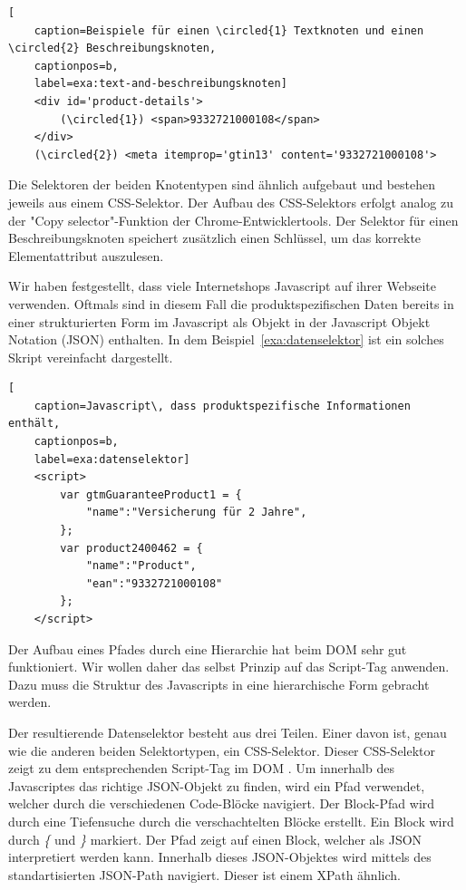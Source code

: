 \begin{lstlisting}[
    caption=Beispiele für einen \circled{1} Textknoten und einen \circled{2} Beschreibungsknoten,
    captionpos=b,
    label=exa:text-and-beschreibungsknoten]
    <div id='product-details'>
        (\circled{1}) <span>9332721000108</span>
    </div>
    (\circled{2}) <meta itemprop='gtin13' content='9332721000108'>
\end{lstlisting}

Die Selektoren der beiden Knotentypen sind ähnlich aufgebaut und bestehen jeweils aus einem CSS-Selektor.
Der Aufbau des CSS-Selektors erfolgt analog zu der "Copy selector"-Funktion der Chrome-Entwicklertools.
Der Selektor für einen Beschreibungsknoten speichert zusätzlich einen Schlüssel, um das korrekte Elementattribut
auszulesen.

Wir haben festgestellt, dass viele Internetshops Javascript auf ihrer Webseite verwenden.
Oftmals sind in diesem Fall die produktspezifischen Daten bereits in einer strukturierten Form im Javascript
als Objekt in der Javascript Objekt Notation (JSON) enthalten.
In dem Beispiel~\ref{exa:datenselektor} ist ein solches Skript vereinfacht dargestellt.

\begin{lstlisting}[
    caption=Javascript\, dass produktspezifische Informationen enthält,
    captionpos=b,
    label=exa:datenselektor]
    <script>
        var gtmGuaranteeProduct1 = {
            "name":"Versicherung für 2 Jahre",
        };
        var product2400462 = {
            "name":"Product",
            "ean":"9332721000108"
        };
    </script>
\end{lstlisting}

Der Aufbau eines Pfades durch eine Hierarchie hat beim DOM sehr gut funktioniert.
Wir wollen daher das selbst Prinzip auf das Script-Tag anwenden.
Dazu muss die Struktur des Javascripts in eine hierarchische Form gebracht werden.

Der resultierende Datenselektor besteht aus drei Teilen.
Einer davon ist, genau wie die anderen beiden Selektortypen, ein CSS-Selektor.
Dieser CSS-Selektor zeigt zu dem entsprechenden Script-Tag im DOM .
Um innerhalb des Javascriptes das richtige JSON-Objekt zu finden, wird ein Pfad verwendet, welcher durch die
verschiedenen Code-Blöcke navigiert.
Der Block-Pfad wird durch eine Tiefensuche durch die verschachtelten Blöcke erstellt.
Ein Block wird durch \textit{\{} und \textit{\}} markiert.
Der Pfad zeigt auf einen Block, welcher als JSON interpretiert werden kann.
Innerhalb dieses JSON-Objektes wird mittels des standartisierten JSON-Path navigiert.
Dieser ist einem XPath ähnlich.

